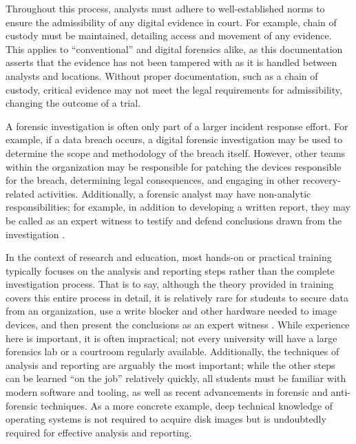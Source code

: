 \documentclass[letterpaper,12pt]{report}
\begin{document}
Throughout this process, analysts must adhere to well-established norms
to ensure the admissibility of any digital evidence in court. For
example, chain of custody must be maintained, detailing access and
movement of any evidence. This applies to ``conventional'' and digital
forensics alike, as this documentation asserts that the evidence has not
been tampered with as it is handled between analysts and locations.
Without proper documentation, such as a chain of custody, critical
evidence may not meet the legal requirements for admissibility, changing
the outcome of a trial.

A forensic investigation is often only part of a larger incident
response effort. For example, if a data breach occurs, a digital
forensic investigation may be used to determine the scope and
methodology of the breach itself. However, other teams within the
organization may be responsible for patching the devices responsible for
the breach, determining legal consequences, and engaging in other
recovery-related activities. Additionally, a forensic analyst may have
non-analytic responsibilities; for example, in addition to developing a
written report, they may be called as an expert witness to testify and
defend conclusions drawn from the investigation
\cite{andersonComparativeStudyTeaching2006,conklinComputerForensics2022,cooperStandardsDigitalForensics2010}.

In the context of research and education, most hands-on or practical
training typically focuses on the analysis and reporting steps rather
than the complete investigation process. That is to say, although the
theory provided in training covers this entire process in detail, it is
relatively rare for students to secure data from an organization, use a
write blocker and other hardware needed to image devices, and then
present the conclusions as an expert witness
\cite{cooperStandardsDigitalForensics2010}. While experience here is
important, it is often impractical; not every university will have a
large forensics lab or a courtroom regularly available. Additionally,
the techniques of analysis and reporting are arguably the most
important; while the other steps can be learned ``on the job''
relatively quickly, all students must be familiar with modern software
and tooling, as well as recent advancements in forensic and
anti-forensic techniques. As a more concrete example, deep technical
knowledge of operating systems is not required to acquire disk images
but is undoubtedly required for effective analysis and reporting.
\end{document}

